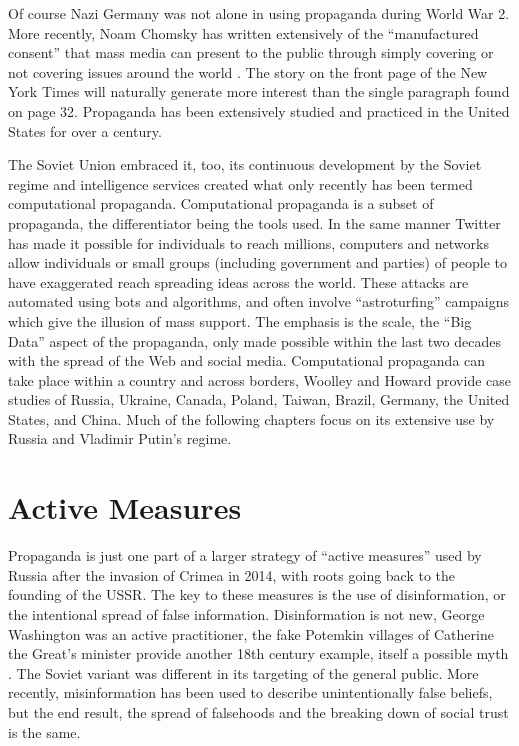 \documentclass[doublespacing]{utdthesis}
\let\cite=\citep
\begin{document}
Of course Nazi Germany was not alone in using propaganda during World War 2.
More recently, Noam Chomsky has written extensively of the ``manufactured consent'' that mass media can present to the public through simply covering or not covering issues around the world \cite{herman2010}.
The story on the front page of the New York Times will naturally generate more interest than the single paragraph found on page 32.
Propaganda has been extensively studied and practiced in the United States for over a century.

The Soviet Union embraced it, too, its continuous development by the Soviet regime and intelligence services created what only recently has been termed computational propaganda.
Computational propaganda is a subset of propaganda, the differentiator being the tools used.
In the same manner Twitter has made it possible for individuals to reach millions, computers and networks allow individuals or small groups (including government and parties) of people to have exaggerated reach spreading ideas across the world.
These attacks are automated using bots and algorithms, and often involve ``astroturfing'' campaigns which give the illusion of mass support.
The emphasis is the scale, the ``Big Data'' aspect of the propaganda, only made possible within the last two decades with the spread of the Web and social media.
Computational propaganda can take place within a country and across borders, Woolley and Howard \citeyear{woolley2018} provide case studies of Russia, Ukraine, Canada, Poland, Taiwan, Brazil, Germany, the United States, and China.
Much of the following chapters focus on its extensive use by Russia and Vladimir Putin's regime.

\section{Active Measures}

Propaganda is just one part of a larger strategy of ``active measures'' used by Russia after the invasion of Crimea in 2014, with roots going back to the founding of the USSR.
The key to these measures is the use of disinformation, or the intentional spread of false information.
Disinformation is not new, George Washington was an active practitioner, the fake Potemkin villages of Catherine the Great's minister provide another 18th century example, itself a possible myth \cite[ch. 24]{chernow2010} \cite[p. 379]{montefiore2016}.
The Soviet variant was different in its targeting of the general public. 
More recently, misinformation has been used to describe unintentionally false beliefs, but the end result, the spread of falsehoods and the breaking down of social trust is the same.
\end{document}
